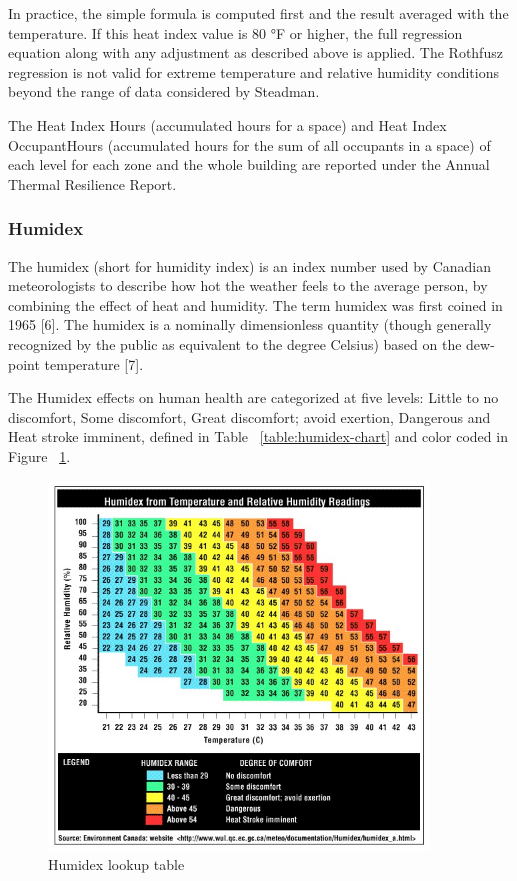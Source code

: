 In practice, the simple formula is computed first and the result averaged with the temperature. If this heat index value is 80 °F or higher, the full regression equation along with any adjustment as described above is applied. The Rothfusz regression is not valid for extreme temperature and relative humidity conditions beyond the range of data considered by Steadman.

The Heat Index Hours (accumulated hours for a space) and Heat Index OccupantHours (accumulated hours for the sum of all occupants in a space) of each level for each zone and the whole building are reported under the Annual Thermal Resilience Report.

\subsubsection{Humidex}\label{humidex}

The humidex (short for humidity index) is an index number used by Canadian meteorologists to describe how hot the weather feels to the average person, by combining the effect of heat and humidity. The term humidex was first coined in 1965 [6]. The humidex is a nominally dimensionless quantity (though generally recognized by the public as equivalent to the degree Celsius) based on the dew-point temperature [7].

The Humidex effects on human health are categorized at five levels: Little to no discomfort, Some discomfort, Great discomfort; avoid exertion, Dangerous and Heat stroke imminent, defined in Table ~\ref{table:humidex-chart} and color coded in Figure ~\ref{fig:humidex-lookup-table}.

\begin{figure}[hbtp] 
\centering
\includegraphics[width=0.9\textwidth, height=0.9\textheight, keepaspectratio=true]{media/humidex_chart.jpg}
\caption{Humidex lookup table \protect \label{fig:humidex-lookup-table}}
\end{figure}

